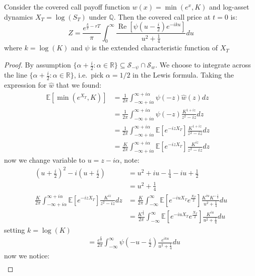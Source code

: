 \begin{theorem}
Consider the covered call payoff function $w(x)=\min(e^x,K)$ and log-asset dynamics $X_T=\log(S_T)$ under $\mathbb{Q}$. Then the covered call price at $t=0$ is:
\begin{equation}Z =\frac{e^{\frac{k}{2}-rT}}{\pi}\int_{0}^{\infty}\frac{\operatorname{Re}[\psi(u-\frac{i}{2})e^{-i k u}]}{u^2+\frac{1}{4}}du
\end{equation}
where $k=\log(K)$ and $\psi$ is the extended characteristic function of $X_T$
\end{theorem}
\begin{proof}
By assumption $\{\alpha +\frac{i}{2} : \alpha\in\mathbb{R}\}\subseteq \mathcal{S}_{-\psi} \cap \mathcal{S}_w$.
We choose to integrate across the line $\{\alpha +\frac{i}{2} : \alpha\in\mathbb{R}\}$, i.e.\ pick $\alpha =1/2$ in the Lewis formula. Taking the expression for $\hat{w}$ that we found:
\begin{align}
    \mathbb{E}[\min(e^{X_T},K)]&=\frac{1}{2\pi}\int_{-\infty+i\alpha}^{\infty+i\alpha}\psi(-z)\hat{w}(z) dz\quad\\
    &=\frac{1}{2\pi}\int_{-\infty+i\alpha}^{\infty+i\alpha}\psi(-z)\frac{K^{1+iz}}{z^2-iz}dz \quad\\
    &=\frac{1}{2\pi}\int_{-\infty+i\alpha}^{\infty+i\alpha}\mathbb{E}[e^{-izX_T}]\frac{K^{1+iz}}{z^2-iz}dz\\
    &=\frac{K}{2\pi}\int_{-\infty+i\alpha}^{\infty+i\alpha}\mathbb{E}[e^{-izX_T}]\frac{K^{iz}}{z^2-iz}dz
\end{align}
now we change variable to $u=z-i\alpha$, note:
\begin{align}
(u+\frac{i}{2})^2-i(u+\frac{i}{2})&=u^2+iu-\frac{1}{4} -iu+\frac{1}{2}\\
&=u^2+\frac{1}{4}\\
\frac{K}{2\pi}\int_{-\infty+i\alpha}^{\infty+i\alpha}\mathbb{E}[e^{-izX_T}]\frac{K^{iz}}{z^2-iz}dz
&=\frac{K}{2\pi}\int_{-\infty}^{\infty}\mathbb{E}[e^{-iuX_T}e^{\frac{X_T}{2}}]\frac{K^{iu}K^{-\frac{1}{2}}}{u^2+\frac{1}{4}}du\\
&=\frac{K^{\frac{1}{2}}}{2\pi}\int_{-\infty}^{\infty}\mathbb{E}[e^{-iuX_T}e^{\frac{X_T}{2}}]\frac{K^{iu}}{u^2+\frac{1}{4}}du
\end{align}
setting $k = \log(K)$
\begin{align}
    &=\frac{e^{\frac{k}{2}}}{2\pi}\int_{-\infty}^{\infty}\psi(-u-\frac{i}{2})\frac{e^{i k u}}{u^2+\frac{1}{4}}du
\end{align}
now we notice:
\begin{align}

\end{align}
\end{proof}
